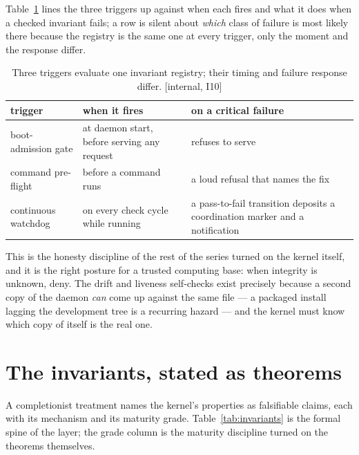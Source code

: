 \documentclass[11pt,a4paper]{article}
\theoremstyle{definition}
\theoremstyle{remark}
\begin{document}
Table~\ref{tab:swk-attestation-triggers} lines the three triggers up against
when each fires and what it does when a checked invariant fails; a row is
silent about \emph{which} class of failure is most likely there because the
registry is the same one at every trigger, only the moment and the response
differ.

\begin{table}[H]
\centering
\caption{Three triggers evaluate one invariant registry; their timing and
failure response differ. [internal, I10]}
\label{tab:swk-attestation-triggers}
\small
\renewcommand{\arraystretch}{1.2}
\begin{tabularx}{\textwidth}{@{}>{\raggedright\arraybackslash}p{} >{\raggedright\arraybackslash}p{} X@{}}
\toprule
\textbf{trigger} & \textbf{when it fires} & \textbf{on a critical failure} \\
\midrule
boot-admission gate & at daemon start, before serving any request & refuses to serve \\
command pre-flight & before a command runs & a loud refusal that names the fix \\
continuous watchdog & on every check cycle while running & a pass-to-fail transition deposits a coordination marker and a notification \\
\bottomrule
\end{tabularx}
\end{table}

This is the honesty discipline of the rest of the series turned on the kernel
itself, and it is the right posture for a trusted computing base: when integrity is
unknown, deny. The drift and liveness self-checks exist precisely because a second
copy of the daemon \emph{can} come up against the same file --- a packaged install
lagging the development tree is a recurring hazard --- and the kernel must know
which copy of itself is the real one.

\section{The invariants, stated as theorems}
\label{sec:invariants}

A completionist treatment names the kernel's properties as falsifiable claims, each
with its mechanism and its maturity grade. Table~\ref{tab:invariants} is the formal
spine of the layer; the grade column is the maturity discipline turned on the
theorems themselves.
\end{document}
